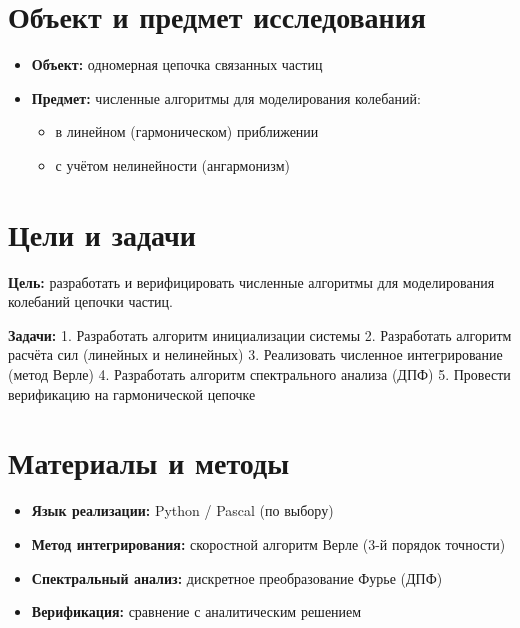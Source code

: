 \documentclass[
  12pt,
  a4paper,
  DIV=11,
  numbers=noendperiod]{scrreprt}
\providecommand{\tightlist}{%
  \setlength{\itemsep}{0pt}\setlength{\parskip}{0pt}}\usepackage{longtable,booktabs,array}
\begin{document}
\section{Объект и предмет
исследования}\label{ux43eux431ux44aux435ux43aux442-ux438-ux43fux440ux435ux434ux43cux435ux442-ux438ux441ux441ux43bux435ux434ux43eux432ux430ux43dux438ux44f}

\begin{itemize}
\tightlist
\item
  \textbf{Объект:} одномерная цепочка связанных частиц
\item
  \textbf{Предмет:} численные алгоритмы для моделирования колебаний:

  \begin{itemize}
  \tightlist
  \item
    в линейном (гармоническом) приближении
  \item
    с учётом нелинейности (ангармонизм)
  \end{itemize}
\end{itemize}

\section{Цели и
задачи}\label{ux446ux435ux43bux438-ux438-ux437ux430ux434ux430ux447ux438}

\textbf{Цель:} разработать и верифицировать численные алгоритмы для
моделирования колебаний цепочки частиц.

\textbf{Задачи:} 1. Разработать алгоритм инициализации системы 2.
Разработать алгоритм расчёта сил (линейных и нелинейных) 3. Реализовать
численное интегрирование (метод Верле) 4. Разработать алгоритм
спектрального анализа (ДПФ) 5. Провести верификацию на гармонической
цепочке

\section{Материалы и
методы}\label{ux43cux430ux442ux435ux440ux438ux430ux43bux44b-ux438-ux43cux435ux442ux43eux434ux44b}

\begin{itemize}
\tightlist
\item
  \textbf{Язык реализации:} Python / Pascal (по выбору)
\item
  \textbf{Метод интегрирования:} скоростной алгоритм Верле (3-й порядок
  точности)
\item
  \textbf{Спектральный анализ:} дискретное преобразование Фурье (ДПФ)
\item
  \textbf{Верификация:} сравнение с аналитическим решением
\end{itemize}
\end{document}
